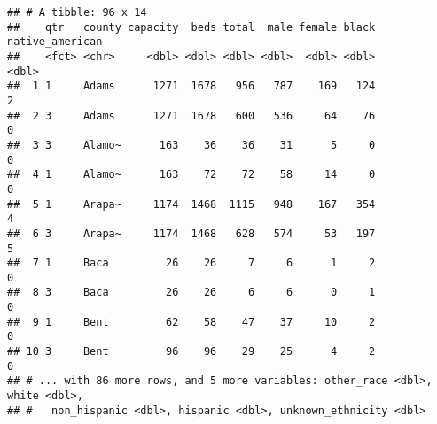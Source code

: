 \documentclass[
]{article}
\newenvironment{Shaded}{\begin{snugshade}}{\end{snugshade}}
\newcommand{\DataTypeTok}[1]{\textcolor[rgb]{0.13,0.29,0.53}{#1}}
\newcommand{\KeywordTok}[1]{\textcolor[rgb]{0.13,0.29,0.53}{\textbf{#1}}}
\newcommand{\NormalTok}[1]{#1}
\newcommand{\OperatorTok}[1]{\textcolor[rgb]{0.81,0.36,0.00}{\textbf{#1}}}
\newcommand{\StringTok}[1]{\textcolor[rgb]{0.31,0.60,0.02}{#1}}
\begin{document}
\begin{Shaded}
\end{Shaded}

\begin{verbatim}
## # A tibble: 96 x 14
##    qtr   county capacity  beds total  male female black native_american
##    <fct> <chr>     <dbl> <dbl> <dbl> <dbl>  <dbl> <dbl>           <dbl>
##  1 1     Adams      1271  1678   956   787    169   124               2
##  2 3     Adams      1271  1678   600   536     64    76               0
##  3 3     Alamo~      163    36    36    31      5     0               0
##  4 1     Alamo~      163    72    72    58     14     0               0
##  5 1     Arapa~     1174  1468  1115   948    167   354               4
##  6 3     Arapa~     1174  1468   628   574     53   197               5
##  7 1     Baca         26    26     7     6      1     2               0
##  8 3     Baca         26    26     6     6      0     1               0
##  9 1     Bent         62    58    47    37     10     2               0
## 10 3     Bent         96    96    29    25      4     2               0
## # ... with 86 more rows, and 5 more variables: other_race <dbl>, white <dbl>,
## #   non_hispanic <dbl>, hispanic <dbl>, unknown_ethnicity <dbl>
\end{verbatim}
\end{document}
